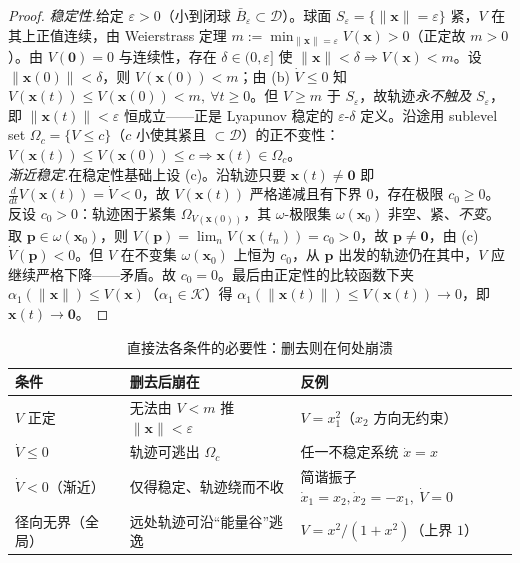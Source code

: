 \begin{proof}
\emph{稳定性.}\;给定 $\varepsilon>0$（小到闭球 $\bar B_\varepsilon\subset\mathcal{D}$）。球面 $S_\varepsilon=\{\|\mathbf{x}\|=\varepsilon\}$ 紧，$V$ 在其上正值连续，由 Weierstrass 定理 $m:=\min_{\|\mathbf{x}\|=\varepsilon}V(\mathbf{x})>0$（正定故 $m>0$）。由 $V(\mathbf{0})=0$ 与连续性，存在 $\delta\in(0,\varepsilon]$ 使 $\|\mathbf{x}\|<\delta\Rightarrow V(\mathbf{x})<m$。设 $\|\mathbf{x}(0)\|<\delta$，则 $V(\mathbf{x}(0))<m$；由 (b) $\dot V\le0$ 知 $V(\mathbf{x}(t))\le V(\mathbf{x}(0))<m,\ \forall t\ge0$。但 $V\ge m$ 于 $S_\varepsilon$，故轨迹\emph{永不触及} $S_\varepsilon$，即 $\|\mathbf{x}(t)\|<\varepsilon$ 恒成立——正是 Lyapunov 稳定的 $\varepsilon$-$\delta$ 定义。沿途用 sublevel set $\Omega_c=\{V\le c\}$（$c$ 小使其紧且 $\subset\mathcal{D}$）的正不变性：$V(\mathbf{x}(t))\le V(\mathbf{x}(0))\le c\Rightarrow\mathbf{x}(t)\in\Omega_c$。\\[2pt]
\emph{渐近稳定.}\;在稳定性基础上设 (c)。沿轨迹只要 $\mathbf{x}(t)\neq\mathbf{0}$ 即 $\frac{d}{dt}V(\mathbf{x}(t))=\dot V<0$，故 $V(\mathbf{x}(t))$ 严格递减且有下界 $0$，存在极限 $c_0\ge0$。反设 $c_0>0$：轨迹困于紧集 $\Omega_{V(\mathbf{x}(0))}$，其 $\omega$-极限集 $\omega(\mathbf{x}_0)$ 非空、紧、\emph{不变}。取 $\mathbf{p}\in\omega(\mathbf{x}_0)$，则 $V(\mathbf{p})=\lim_n V(\mathbf{x}(t_n))=c_0>0$，故 $\mathbf{p}\neq\mathbf{0}$，由 (c) $\dot V(\mathbf{p})<0$。但 $V$ 在不变集 $\omega(\mathbf{x}_0)$ 上恒为 $c_0$，从 $\mathbf{p}$ 出发的轨迹仍在其中，$V$ 应继续严格下降——矛盾。故 $c_0=0$。最后由正定性的比较函数下夹 $\alpha_1(\|\mathbf{x}\|)\le V(\mathbf{x})$（$\alpha_1\in\mathcal{K}$）得 $\alpha_1(\|\mathbf{x}(t)\|)\le V(\mathbf{x}(t))\to0$，即 $\mathbf{x}(t)\to\mathbf{0}$。
\end{proof}

\begin{table}[H]\centering\small
\caption{直接法各条件的必要性：删去则在何处崩溃}
\label{tab:lyap-direct-necessity}
\begin{tabular}{lll}
\toprule
条件 & 删去后崩在 & 反例 \\
\midrule
$V$ 正定 & 无法由 $V<m$ 推 $\|\mathbf{x}\|<\varepsilon$ & $V=x_1^2$（$x_2$ 方向无约束） \\
$\dot V\le0$ & 轨迹可逃出 $\Omega_c$ & 任一不稳定系统 $\dot x=x$ \\
$\dot V<0$（渐近） & 仅得稳定、轨迹绕而不收 & 简谐振子 $\dot x_1=x_2,\dot x_2=-x_1,\ \dot V=0$ \\
径向无界（全局） & 远处轨迹可沿“能量谷”逃逸 & $V=x^2/(1+x^2)$（上界 $1$） \\
\bottomrule
\end{tabular}
\end{table}

